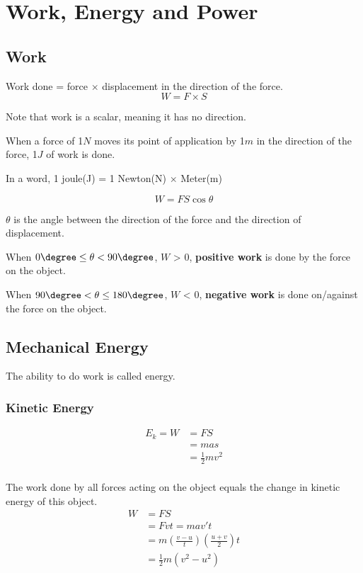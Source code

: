 \documentclass[11pt, a4paper,oneside]{book}
\begin{document}
\section{Work, Energy and Power}
\subsection{Work}
\begin{theorem}[Work]
    Work done = force $\times$ displacement in the direction of the force.
    $$W = F \times S$$
\end{theorem}


Note that work is a scalar, meaning it has no direction.
\begin{definition}[Joule]
    When a force of 1$N$ moves its point of application by 1$m$ in the direction of the force, 1$J$ of work is done.
\end{definition}

In a word, 1 joule(J) = 1 Newton(N) $\times$ Meter(m)\par
$$ W = FS\cos{\theta}$$\par
$\theta$ is the angle between the direction of the force and the direction of displacement.\par
When $0\degree \le \theta < 90\degree$, $W$ > $0$, \textbf{positive work} is done by the force on the object.\par
When $90\degree < \theta \le 180\degree$, $W$ < $0$, \textbf{negative work} is done on/against the force on the object.\par

\subsection{Mechanical Energy}
\begin{definition}[Energy]
    The ability to do work is called energy.
\end{definition}
\subsubsection{Kinetic Energy}

\begin{align*}
    E_k = W & = FS\\
    & = mas\\
    & = \frac{1}{2}mv^2\\
\end{align*}

\begin{theorem}
    The work done by all forces acting on the object equals the change in kinetic energy of this object. 
\begin{align*}
    W & = FS\\
    & = Fvt = ma v't \\
    & = m(\frac{v-u}{t})(\frac{u+v}{2})t\\
    & = \frac{1}{2}m(v^2 - u^2)\\
\end{align*}
\end{theorem}
\end{document}

